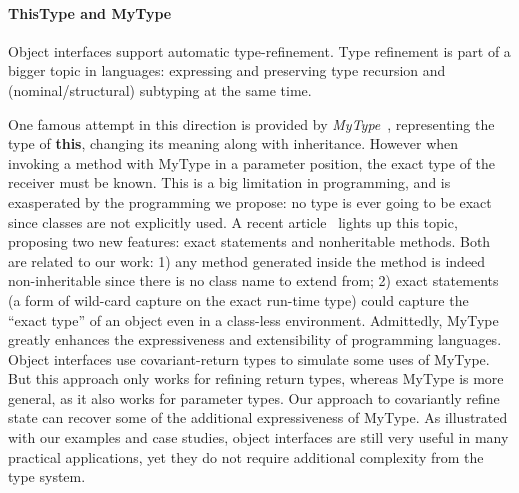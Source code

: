 % 

\paragraph{ThisType and MyType}
Object interfaces support automatic type-refinement.
Type refinement is part of a bigger topic in \classbased languages: expressing and
preserving type recursion and (nominal/structural) subtyping at the same time.

One famous attempt in this direction is provided by
\emph{MyType}~\cite{bruce1994paradigmatic}, representing the type of
\textbf{this}, changing its meaning along with inheritance. However when
invoking a method with MyType in a parameter position, the exact type of the
receiver must be known.  This is a big limitation in \classbased \objectoriented
programming, and is exasperated by the \interfacebased programming we propose: no
type is ever going to be exact since classes are not explicitly used. A recent
article~\cite{Saito2013933} lights up this topic, proposing two
new features: exact statements and nonheritable methods. Both are
related to our work: 1) any method generated inside the \Q@of@ method is indeed
non-inheritable since there is no class name to extend from; 2) exact
statements (a form of wild-card capture on the exact run-time type) could
capture the ``exact type'' of an object even in a class-less
environment.
Admittedly, MyType greatly enhances the expressiveness and extensibility of
\objectoriented programming languages. Object interfaces use covariant-return types to
simulate some uses of MyType. But this approach only works for refining
return types, whereas MyType is more general, as it also works for
parameter types. Our approach to covariantly refine state can recover
some of the additional expressiveness of MyType. As illustrated with our examples and
case studies, object interfaces are still very useful in many
practical applications, yet they do not require additional
complexity from the type system.



